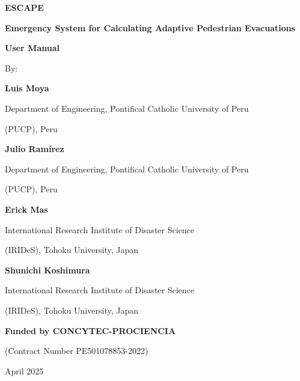 \documentclass[12pt,a4paper]{book}
\begin{document}

\begin{titlepage}
  \centering
  \vspace*{0.5cm}
  {\LARGE\bfseries ESCAPE\par}
  \vspace{0.3cm}
  {\small\bfseries Emergency System for Calculating Adaptive Pedestrian Evacuations\par}
  \vspace{1.6cm}
  {\LARGE\bfseries User Manual\par}
  \vspace{1.5cm}
  {\small By:\par}
  \vspace{1.0cm}
  {\large\bfseries Luis Moya\par}
  {\large Department of Engineering, Pontifical Catholic University of Peru\par
   (PUCP), Peru\par}
  \vspace{0.9cm}
  {\large\bfseries Julio Ramírez\par}
  {\large Department of Engineering, Pontifical Catholic University of Peru\par
   (PUCP), Peru\par}
  \vspace{0.9cm}
  {\large\bfseries Erick Mas\par}
  {\large International Research Institute of Disaster Science\par
   (IRIDeS), Tohoku University, Japan\par}
  \vspace{0.9cm}
  {\large\bfseries Shunichi Koshimura\par}
  {\large International Research Institute of Disaster Science\par
   (IRIDeS), Tohoku University, Japan\par}
  \vspace{2.2cm}
  {\large\bfseries Funded by CONCYTEC-PROCIENCIA\par
   (Contract Number PE501078853-2022)\par}
  \vfill
  {\large April 2025\par}
  \vspace{1cm}
\end{titlepage}
\end{document}
